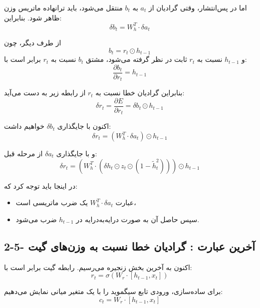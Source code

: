 \documentclass{article}
\begin{document}
اما در پس‌انتشار، وقتی گرادیان از $a_t$ به $b_t$ منتقل می‌شود، باید ترانهاده ماتریس وزن ظاهر شود. بنابراین:
\begin{equation}
	\delta b_t=W_h^T\cdot \delta a_t
\end{equation}

از طرف دیگر، چون
\begin{equation}
	b_t=r_t\odot h_{t-1}
\end{equation}
و $h_{t-1}$ نسبت به $r_t$ ثابت در نظر گرفته می‌شود، مشتق $b_t$ نسبت به $r_t$ برابر است با:
\begin{equation}
	\frac{\partial b_t}{\partial r_t}=h_{t-1}
\end{equation}

بنابراین گرادیان خطا نسبت به $r_t$ از رابطه زیر به دست می‌آید:
\begin{equation}
	\delta r_t
	=
	\frac{\partial E}{\partial r_t}
	=
	\delta b_t\odot h_{t-1}
\end{equation}

اکنون با جایگذاری $\delta b_t$ خواهیم داشت:
\begin{equation}
	\delta r_t
	=
	(W_h^T\cdot \delta a_t)\odot h_{t-1}
\end{equation}

و با جایگذاری $\delta a_t$ از مرحله قبل:
\begin{equation}
	\delta r_t
	=
	\left(W_h^T\cdot\left(\delta h_t\odot z_t\odot(1-\widetilde{h}_t^2)\right)\right)\odot h_{t-1}
\end{equation}

در اینجا باید توجه کرد که:
\begin{itemize}
	\item عبارت $W_h^T\cdot \delta a_t$ یک ضرب ماتریسی است،
	\item سپس حاصل آن به صورت درایه‌به‌درایه در $h_{t-1}$ ضرب می‌شود.
\end{itemize}

\subsection{2-5- آخرین عبارت : گرادیان خطا نسبت به وزن‌های گیت }

اکنون به آخرین بخش زنجیره می‌رسیم.  
رابطه گیت  برابر است با:
\begin{equation}
	r_t=\sigma\left(W_r\cdot[h_{t-1},x_t]\right)
\end{equation}

برای ساده‌سازی، ورودی تابع سیگموید را با یک متغیر میانی نمایش می‌دهیم:
\begin{equation}
	c_t=W_r\cdot[h_{t-1},x_t]
\end{equation}
\end{document}
